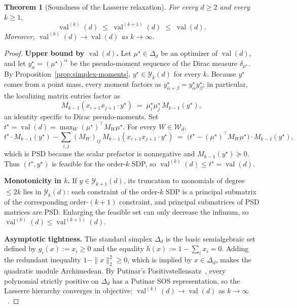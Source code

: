 \documentclass[11pt, letterpaper]{article}
\theoremstyle{paperplain}
\newtheorem{theorem}{Theorem}[section]
\theoremstyle{paperdef}
\newcommand{\val}{\operatorname{val}}
\newcommand{\PSD}{\succeq 0}
\begin{document}
\begin{theorem}[Soundness of the Lasserre relaxation]
\label{thm:lasserre-soundness}
For every $d\ge 2$ and every $k\ge 1$,
\[
  \val^{(k)}(d) \;\le\; \val^{(k+1)}(d) \;\le\; \val(d).
\]
Moreover, $\val^{(k)}(d)\to \val(d)$ as $k\to\infty$.
\end{theorem}

\begin{proof}
\textbf{Upper bound by $\val(d)$.}
Let $\mu^\star\in\Delta_d$ be an optimizer of $\val(d)$, and let
$y^\star_\alpha=(\mu^\star)^\alpha$ be the pseudo-moment sequence
of the Dirac measure $\delta_{\mu^\star}$.  By
Proposition~\ref{prop:simplex-moments}, $y^\star\in\mathcal{Y}_k(d)$
for every $k$.  Because $y^\star$ comes from a point mass, every
moment factors as $y^\star_{\alpha+\beta}=y^\star_\alpha y^\star_\beta$;
in particular, the localizing matrix entries factor as
\[
  M_{k-1}(x_{i+1}x_{j+1}\cdot y^\star)
  \;=\;
  \mu^\star_i\mu^\star_j\,M_{k-1}(y^\star),
\]
an identity specific to Dirac pseudo-moments.  Set
$t^\star=\val(d)=\max_W (\mu^\star)^\top M_W\mu^\star$.  For every
$W\in\mathcal{W}_d$,
\[
  t^\star\cdot M_{k-1}(y^\star) - \sum_{i,j}(M_W)_{ij}\,M_{k-1}(x_{i+1}x_{j+1}\cdot y^\star)
  \;=\;
  \bigl(t^\star - (\mu^\star)^\top M_W\mu^\star\bigr)\cdot M_{k-1}(y^\star),
\]
which is PSD because the scalar prefactor is nonnegative and
$M_{k-1}(y^\star)\PSD$.  Thus $(t^\star, y^\star)$ is feasible for
the order-$k$ SDP, so $\val^{(k)}(d)\le t^\star=\val(d)$.

\textbf{Monotonicity in $k$.}
If $y\in\mathcal{Y}_{k+1}(d)$, its truncation to monomials of degree
$\le 2k$ lies in $\mathcal{Y}_k(d)$: each constraint of the order-$k$
SDP is a principal submatrix of the corresponding order-$(k+1)$
constraint, and principal submatrices of PSD matrices are PSD.
Enlarging the feasible set can only decrease the infimum, so
$\val^{(k)}(d)\le \val^{(k+1)}(d)$.

\textbf{Asymptotic tightness.}
The standard simplex $\Delta_d$ is the basic semialgebraic set defined
by $g_i(x):=x_i\ge 0$ and the equality $h(x):=1-\sum_i x_i=0$.  Adding
the redundant inequality $1-\|x\|_2^2\ge 0$, which is implied by
$x\in\Delta_d$, makes the quadratic module Archimedean.  By Putinar's
Positivstellensatz~\cite{Putinar1993}, every polynomial strictly
positive on $\Delta_d$ has a Putinar SOS representation, so the
Lasserre hierarchy converges in objective: $\val^{(k)}(d)\to\val(d)$ as
$k\to\infty$~\cite[Thm.~4.2]{Lasserre2001}.
\end{proof}
\end{document}
